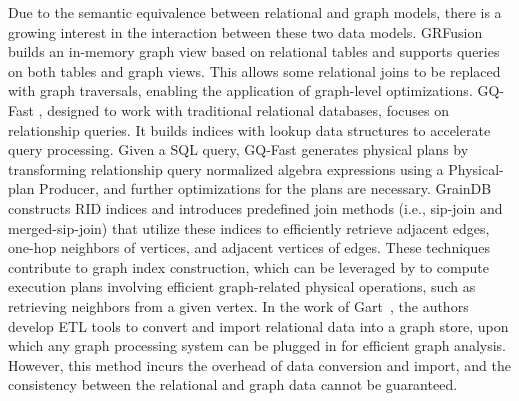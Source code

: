  Due to the semantic equivalence between relational and graph models, there is a growing interest in the interaction between these two data models. GRFusion \cite{GRFusion} builds an in-memory graph view based on relational tables and supports queries on both tables and graph views. This allows some relational joins to be replaced with graph traversals, enabling the application of graph-level optimizations. GQ-Fast \cite{gqfast}, designed to work with traditional relational databases, focuses on relationship queries. It builds indices with lookup data structures to accelerate query processing. Given a SQL query, GQ-Fast generates physical plans by transforming relationship query normalized algebra expressions using a Physical-plan Producer, and further optimizations for the plans are necessary. GrainDB \cite{graindb} constructs RID indices and introduces predefined join methods (i.e., sip-join and merged-sip-join) that utilize these indices to efficiently retrieve adjacent edges, one-hop neighbors of vertices, and adjacent vertices of edges. These techniques contribute to graph index construction, which can be leveraged by \name to compute execution plans involving efficient graph-related physical operations, such as retrieving neighbors from a given vertex. In the work of Gart~\cite{gart}, the authors develop ETL tools to convert and import relational data into a graph store, upon which any graph processing system can be plugged in for efficient graph analysis. However, this method incurs the overhead of data conversion and import, and the consistency between the relational and graph data cannot be guaranteed.






